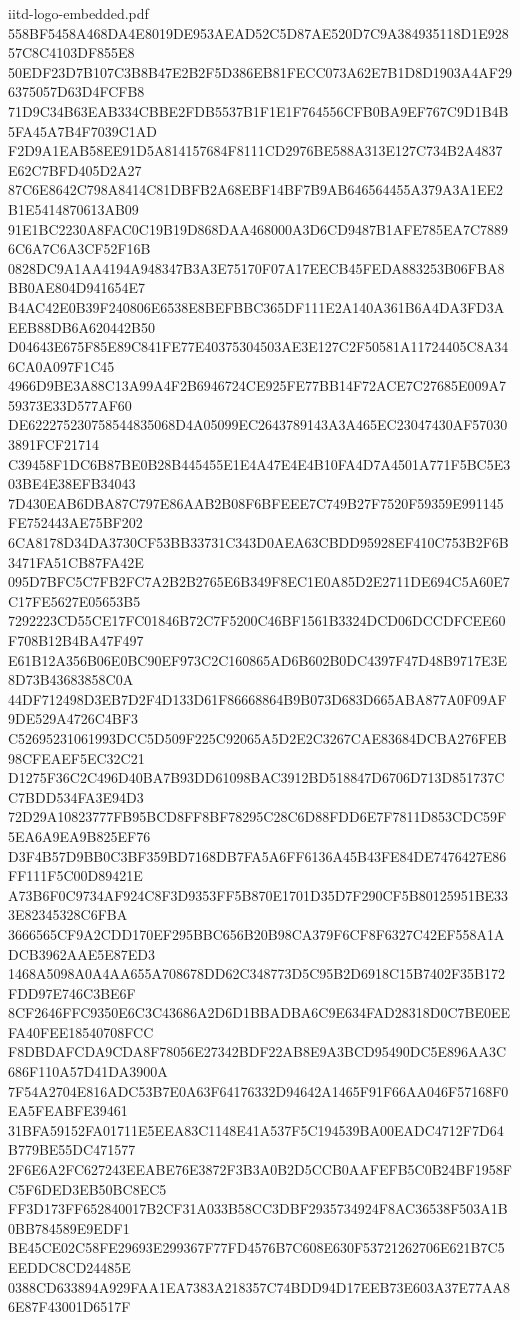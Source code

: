 \begin{filecontents*}[overwrite]{iitd-logo-embedded.pdf}
558BF5458A468DA4E8019DE953AEAD52C5D87AE520D7C9A384935118D1E92857C8C4103DF855E8
50EDF23D7B107C3B8B47E2B2F5D386EB81FECC073A62E7B1D8D1903A4AF296375057D63D4FCFB8
71D9C34B63EAB334CBBE2FDB5537B1F1E1F764556CFB0BA9EF767C9D1B4B5FA45A7B4F7039C1AD
F2D9A1EAB58EE91D5A814157684F8111CD2976BE588A313E127C734B2A4837E62C7BFD405D2A27
87C6E8642C798A8414C81DBFB2A68EBF14BF7B9AB646564455A379A3A1EE2B1E5414870613AB09
91E1BC2230A8FAC0C19B19D868DAA468000A3D6CD9487B1AFE785EA7C78896C6A7C6A3CF52F16B
0828DC9A1AA4194A948347B3A3E75170F07A17EECB45FEDA883253B06FBA8BB0AE804D941654E7
B4AC42E0B39F240806E6538E8BEFBBC365DF111E2A140A361B6A4DA3FD3AEEB88DB6A620442B50
D04643E675F85E89C841FE77E40375304503AE3E127C2F50581A11724405C8A346CA0A097F1C45
4966D9BE3A88C13A99A4F2B6946724CE925FE77BB14F72ACE7C27685E009A759373E33D577AF60
DE622275230758544835068D4A05099EC2643789143A3A465EC23047430AF570303891FCF21714
C39458F1DC6B87BE0B28B445455E1E4A47E4E4B10FA4D7A4501A771F5BC5E303BE4E38EFB34043
7D430EAB6DBA87C797E86AAB2B08F6BFEEE7C749B27F7520F59359E991145FE752443AE75BF202
6CA8178D34DA3730CF53BB33731C343D0AEA63CBDD95928EF410C753B2F6B3471FA51CB87FA42E
095D7BFC5C7FB2FC7A2B2B2765E6B349F8EC1E0A85D2E2711DE694C5A60E7C17FE5627E05653B5
7292223CD55CE17FC01846B72C7F5200C46BF1561B3324DCD06DCCDFCEE60F708B12B4BA47F497
E61B12A356B06E0BC90EF973C2C160865AD6B602B0DC4397F47D48B9717E3E8D73B43683858C0A
44DF712498D3EB7D2F4D133D61F86668864B9B073D683D665ABA877A0F09AF9DE529A4726C4BF3
C52695231061993DCC5D509F225C92065A5D2E2C3267CAE83684DCBA276FEB98CFEAEF5EC32C21
D1275F36C2C496D40BA7B93DD61098BAC3912BD518847D6706D713D851737CC7BDD534FA3E94D3
72D29A10823777FB95BCD8FF8BF78295C28C6D88FDD6E7F7811D853CDC59F5EA6A9EA9B825EF76
D3F4B57D9BB0C3BF359BD7168DB7FA5A6FF6136A45B43FE84DE7476427E86FF111F5C00D89421E
A73B6F0C9734AF924C8F3D9353FF5B870E1701D35D7F290CF5B80125951BE333E82345328C6FBA
3666565CF9A2CDD170EF295BBC656B20B98CA379F6CF8F6327C42EF558A1ADCB3962AAE5E87ED3
1468A5098A0A4AA655A708678DD62C348773D5C95B2D6918C15B7402F35B172FDD97E746C3BE6F
8CF2646FFC9350E6C3C43686A2D6D1BBADBA6C9E634FAD28318D0C7BE0EEFA40FEE18540708FCC
F8DBDAFCDA9CDA8F78056E27342BDF22AB8E9A3BCD95490DC5E896AA3C686F110A57D41DA3900A
7F54A2704E816ADC53B7E0A63F64176332D94642A1465F91F66AA046F57168F0EA5FEABFE39461
31BFA59152FA01711E5EEA83C1148E41A537F5C194539BA00EADC4712F7D64B779BE55DC471577
2F6E6A2FC627243EEABE76E3872F3B3A0B2D5CCB0AAFEFB5C0B24BF1958FC5F6DED3EB50BC8EC5
FF3D173FF652840017B2CF31A033B58CC3DBF2935734924F8AC36538F503A1B0BB784589E9EDF1
BE45CE02C58FE29693E299367F77FD4576B7C608E630F53721262706E621B7C5EEDDC8CD24485E
0388CD633894A929FAA1EA7383A218357C74BDD94D17EEB73E603A37E77AA86E87F43001D6517F

\end{filecontents*}
